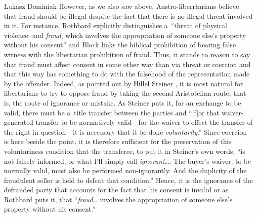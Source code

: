 \begin{artengenv}{Łukasz Dominiak}
However, as we also saw above, Austro-liberrtarians believe that fraud should be illegal despite the fact that there is no illegal threat involved in it. For instance, Rothbard 
\parencite*[][p.77]{rothbard_ethics_1998} %
 explicitly distinguishes a~``threat of physical violence; and \textit{fraud}, which involves the appropriation of someone else's property without his consent'' and Block 
\parencite*[][p.38]{block_natural_2015} %
 links the biblical prohibition of bearing false witness with the libertarian prohibition of fraud. Thus, it stands to reason to say that fraud must affect consent in some other way than via threat or coercion and that this way has something to do with the falsehood of the representation made by the offender. Indeed, as pointed out by Hillel Steiner 
\parencite*[][p.100]{steiner_asymmetric_2019}, %
 it is most natural for libertarians to try to oppose fraud by taking the second Aristotelian route, that is, the route of ignorance or mistake. As Steiner 
\parencite*[][p.100]{steiner_asymmetric_2019} %
 puts it, for an exchange to be valid, there must be a~title transfer between the parties and ``[f]or that waiver-generated transfer to be normatively valid---for the waiver to effect the transfer of the right in question---it is necessary that it be done \textit{voluntarily}.'' Since coercion is here beside the point, it is therefore sufficient for the preservation of this voluntariness condition that the transferee, to put it in Steiner's 
\parencite*[][p.100]{steiner_asymmetric_2019} %
 own words, ``is not falsely informed, or what I'll simply call \textit{ignorant}…. The buyer's waiver, to be normally valid, must also be performed non-ignorantly. And the duplicity of the fraudulent seller is held to defeat that condition.'' Hence, it is the ignorance of the defrauded party that accounts for the fact that his consent is invalid or as Rothbard 
\parencite*[][p.77]{rothbard_ethics_1998} %
 puts it, that ``\textit{fraud}… involves the appropriation of someone else's property without his consent.''




\end{artengenv}
